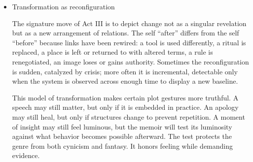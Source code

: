 \documentclass[11pt]{article}
\begin{document}
\begin{itemize}
Choose decisive mediators. Not every object or institution merits narrative weight. Select those that alter probability: the ones whose presence or absence changes what can happen in the scene. Treat the rest as atmosphere.

Name the feedback. When an action triggers a response that triggers a revision of belief or behavior, state the chain. The explicitness need not be pedantic. A short clause can carry causal history. The goal is to let readers see learning, not only outcomes.

Track costs. Systems have tradeoffs. A ritual that binds can also constrain. A technology that extends reach can also narrow attention. A policy that protects can also exclude. Registering costs—even when the choice remains right—prevents sentimentality.

Stabilize diction. Systemic writing can collapse under metaphor that shifts too quickly. Keep technical terms consistent and let images recur rather than proliferate. Repetition builds the sense of a world whose parts are in conversation.

Use silence as structure. Systemic accounts can still leave out. When they do, the omission should feel intentional: a gap that the world itself imposes (privacy, safety, epistemic limit), not a lapse of craft.

These techniques do not add ornament. They allocate attention so the network can be apprehended without a map.
\item Transformation as reconfiguration
\label{sec:org08089e9}

The signature move of Act III is to depict change not as a singular revelation but as a new arrangement of relations. The self “after” differs from the self “before” because links have been rewired: a tool is used differently, a ritual is replaced, a place is left or returned to with altered terms, a rule is renegotiated, an image loses or gains authority. Sometimes the reconfiguration is sudden, catalyzed by crisis; more often it is incremental, detectable only when the system is observed across enough time to display a new baseline.

This model of transformation makes certain plot gestures more truthful. A speech may still matter, but only if it is embedded in practice. An apology may still heal, but only if structures change to prevent repetition. A moment of insight may still feel luminous, but the memoir will test its luminosity against what behavior becomes possible afterward. The test protects the genre from both cynicism and fantasy. It honors feeling while demanding evidence.


\end{itemize}
\end{document}
